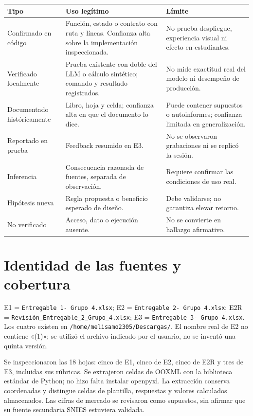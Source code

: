 \documentclass[11pt,a4paper]{report}
\begin{document}
\begin{longtable}{P{2.8cm}P{6.2cm}P{7cm}}
\toprule Tipo & Uso legítimo & Límite \\\midrule\endhead
Confirmado en código & Función, estado o contrato con ruta y líneas. Confianza alta sobre la implementación inspeccionada. & No prueba despliegue, experiencia visual ni efecto en estudiantes.\\
Verificado localmente & Prueba existente con doble del LLM o cálculo sintético; comando y resultado registrados. & No mide exactitud real del modelo ni desempeño de producción.\\
Documentado históricamente & Libro, hoja y celda; confianza alta en que el documento lo dice. & Puede contener supuestos o autoinformes; confianza limitada en generalización.\\
Reportado en prueba & Feedback resumido en E3. & No se observaron grabaciones ni se replicó la sesión.\\
Inferencia & Consecuencia razonada de fuentes, separada de observación. & Requiere confirmar las condiciones de uso real.\\
Hipótesis nueva & Regla propuesta o beneficio esperado de diseño. & Debe validarse; no garantiza elevar retorno.\\
No verificado & Acceso, dato o ejecución ausente. & No se convierte en hallazgo afirmativo.\\\bottomrule
\end{longtable}

\section{Identidad de las fuentes y cobertura}
E1 = \nolinkurl{Entregable 1- Grupo 4.xlsx}; E2 = \nolinkurl{Entregable 2- Grupo 4.xlsx}; E2R = \nolinkurl{Revisión_Entregable_2_Grupo_4.xlsx}; E3 = \nolinkurl{Entregable 3- Grupo 4.xlsx}. Los cuatro existen en \nolinkurl{/home/melisamo2305/Descargas/}. El nombre real de E2 no contiene «(1)»; se utilizó el archivo indicado por el usuario, no se inventó una quinta versión.

Se inspeccionaron las 18 hojas: cinco de E1, cinco de E2, cinco de E2R y tres de E3, incluidas sus rúbricas. Se extrajeron celdas de OOXML con la biblioteca estándar de Python; no hizo falta instalar openpyxl. La extracción conserva coordenadas y distingue celdas de plantilla, respuestas y valores calculados almacenados. Las cifras de mercado se revisaron como supuestos, sin afirmar que su fuente secundaria SNIES estuviera validada.
\end{document}
